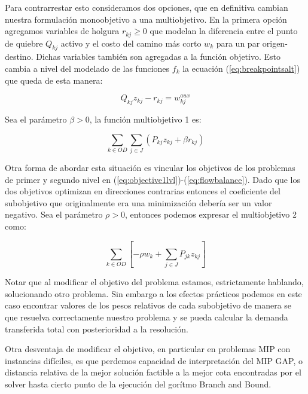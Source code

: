 \documentclass{article}
\begin{document}
  Para contrarrestar esto consideramos dos opciones, que en definitiva cambian nuestra formulación monoobjetivo a una multiobjetivo. En la primera opción agregamos variables de holgura $r_{kj} \geq 0$ que modelan la diferencia entre el punto de quiebre $Q_{kj}$ activo y el costo del camino más corto $w_k$ para un par origen-destino. Dichas variables también son agregadas a la función objetivo.
  Esto cambia a nivel del modelado de las funciones $f_k$ la ecuación (\ref{eq:breakpointsalt}) que queda de esta manera:

  \begin{equation}
    \label{eq:multipleobj1breakpoint}
    Q_{kj} z_{kj} - r_{kj} = w^{aux}_{kj}
  \end{equation}

  Sea el parámetro $\beta > 0$, la función multiobjetivo 1 es:

  \begin{equation}
    \label{eq:multipleobj1}
    \sum_{k \in OD} \sum_{j \in J} \left( P_{kj}z_{kj} + \beta r_{kj} \right)
  \end{equation}

  Otra forma de abordar esta situación es vincular los objetivos de los problemas de primer y segundo nivel en (\ref{eq:objective1lvl})-(\ref{eq:flowbalance}). Dado que los dos objetivos optimizan en direcciones contrarias entonces el coeficiente del subobjetivo que originalmente era una minimización debería ser un valor negativo. Sea el parámetro $\rho > 0$, entonces podemos expresar el multiobjetivo 2 como:

  \begin{equation}
    \label{eq:multipleobj2}
    \sum_{k \in OD} \left[ -\rho w_k + \sum_{j \in J} P_{jk}z_{kj} \right]
  \end{equation}

  Notar que al modificar el objetivo del problema estamos, estrictamente hablando, solucionando otro problema. Sin embargo a los efectos prácticos podemos en este caso encontrar valores de los pesos relativos de cada subobjetivo de manera se que resuelva correctamente nuestro problema y se pueda calcular la demanda transferida total con posterioridad a la resolución.

  Otra desventaja de modificar el objetivo, en particular en problemas MIP con instancias difíciles, es que perdemos capacidad de interpretación del MIP GAP, o distancia relativa de la mejor solución factible a la mejor cota encontradas por el solver hasta cierto punto de la ejecución del gorítmo Branch and Bound.
\end{document}
